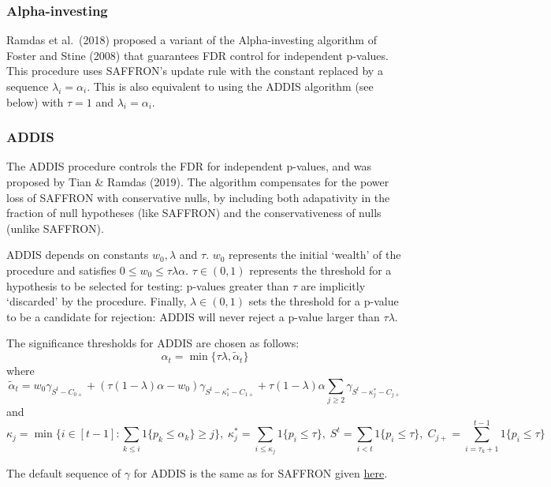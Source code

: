 \documentclass[
]{article}
\begin{document}
\hypertarget{AlphaInvesting}{%
\subsubsection{Alpha-investing}\label{AlphaInvesting}}

Ramdas et al.~(2018) proposed a variant of the Alpha-investing algorithm
of Foster and Stine (2008) that guarantees FDR control for independent
p-values. This procedure uses SAFFRON's update rule with the constant
\eqn{\lambda} replaced by a sequence \(\lambda_i = \alpha_i\). This is
also equivalent to using the ADDIS algorithm (see below) with
\(\tau = 1\) and \(\lambda_i = \alpha_i\).

\hypertarget{ADDIS}{%
\subsubsection{ADDIS}\label{ADDIS}}

The ADDIS procedure controls the FDR for independent p-values, and was
proposed by Tian \& Ramdas (2019). The algorithm compensates for the
power loss of SAFFRON with conservative nulls, by including both
adapativity in the fraction of null hypotheses (like SAFFRON) and the
conservativeness of nulls (unlike SAFFRON).

ADDIS depends on constants \(w_0, \lambda\) and \(\tau\). \(w_0\)
represents the initial `wealth' of the procedure and satisfies
\(0 \leq w_0 \leq \tau \lambda \alpha\). \(\tau \in (0,1)\) represents
the threshold for a hypothesis to be selected for testing: p-values
greater than \(\tau\) are implicitly `discarded' by the procedure.
Finally, \(\lambda \in (0,1)\) sets the threshold for a p-value to be a
candidate for rejection: ADDIS will never reject a p-value larger than
\(\tau \lambda\).

The significance thresholds for ADDIS are chosen as follows: \[ 
\alpha_t = \min\{\tau\lambda, \tilde{\alpha}_t\}
\] where \[
\tilde{\alpha}_t = w_0 \gamma_{S^t-C_{0+}} +
(\tau(1-\lambda)\alpha - w_0)\gamma_{S^t - \kappa_1^*-C_{1+}} + 
\tau(1-\lambda)\alpha \sum_{j \geq 2} \gamma_{S^t - \kappa_j^* - C_{j+}}
\] and \[
\kappa_j = \min\{i \in [t-1] : \sum_{k \leq i} 
1 \{p_k \leq \alpha_k\} \geq j\}, \;
\kappa_j^* = \sum_{i \leq \kappa_j} 1 \{p_i \leq \tau \}, \;
S^t = \sum_{i < t} 1 \{p_i \leq \tau \}, \;
C_{j+} = \sum_{i = \tau_k + 1}^{t-1} 1\{p_i \leq \tau\}
\]

The default sequence of \(\gamma\) for ADDIS is the same as for SAFFRON
given \protect\hyperlink{SAFFRON_gamma}{here}.
\end{document}
